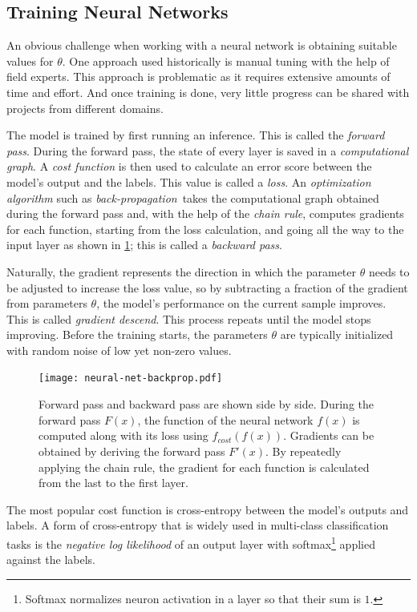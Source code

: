 \subsection{Training Neural Networks}

An obvious challenge when working with a neural network is obtaining suitable values for $\theta$. One approach used historically is manual tuning with the help of field experts. This approach is problematic as it requires extensive amounts of time and effort. And once training is done, very little progress can be shared with projects from different domains.

The model is trained by first running an inference. This is called the \emph{forward pass}. During the forward pass, the state of every layer is saved in a \emph{computational graph}. A \emph{cost function} is then used to calculate an error score between the model's output and the labels. This value is called a \emph{loss}. An \emph{optimization algorithm} such as \emph{back-propagation}\,\cite{BackProp1986} takes the computational graph obtained during the forward pass and, with the help of the \emph{chain rule}, computes gradients for each function, starting from the loss calculation, and going all the way to the input layer as shown in \ref{fig:back-prop}; this is called a \emph{backward pass}.

Naturally, the gradient represents the direction in which the parameter $\theta$ needs to be adjusted to increase the loss value, so by subtracting a fraction of the gradient from parameters $\theta$, the model's performance on the current sample improves. This is called \emph{gradient descend}. This process repeats until the model stops improving. Before the training starts, the parameters $\theta$ are typically initialized with random noise of low yet non-zero values.

\begin{figure}[H]
  \centering
  \texttt{[image: neural-net-backprop.pdf]}
  \caption{Forward pass and backward pass are shown side by side. During the forward pass $F(x)$, the function of the neural network $f(x)$ is computed along with its loss using $f_{cost}(f(x))$. Gradients can be obtained by deriving the forward pass $F'(x)$. By repeatedly applying the chain rule, the gradient for each function is calculated from the last to the first layer.}
  \label{fig:back-prop}
\end{figure}

The most popular cost function is cross-entropy between the model's outputs and labels. A form of cross-entropy that is widely used in multi-class classification tasks is the \emph{negative log likelihood} of an output layer with softmax\footnote{Softmax normalizes neuron activation in a layer so that their sum is $1$.} applied against the labels.

